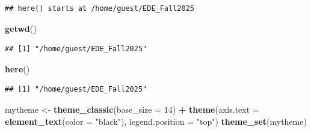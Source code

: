 \documentclass[
]{article}
\newenvironment{Shaded}{\begin{snugshade}}{\end{snugshade}}
\newcommand{\AttributeTok}[1]{\textcolor[rgb]{0.13,0.29,0.53}{#1}}
\newcommand{\DecValTok}[1]{\textcolor[rgb]{0.00,0.00,0.81}{#1}}
\newcommand{\FunctionTok}[1]{\textcolor[rgb]{0.13,0.29,0.53}{\textbf{#1}}}
\newcommand{\NormalTok}[1]{#1}
\newcommand{\OtherTok}[1]{\textcolor[rgb]{0.56,0.35,0.01}{#1}}
\newcommand{\SpecialCharTok}[1]{\textcolor[rgb]{0.81,0.36,0.00}{\textbf{#1}}}
\newcommand{\StringTok}[1]{\textcolor[rgb]{0.31,0.60,0.02}{#1}}
\begin{document}
\begin{verbatim}
## here() starts at /home/guest/EDE_Fall2025
\end{verbatim}

\begin{Shaded}
\begin{Highlighting}[]
\FunctionTok{getwd}\NormalTok{()}
\end{Highlighting}
\end{Shaded}

\begin{verbatim}
## [1] "/home/guest/EDE_Fall2025"
\end{verbatim}

\begin{Shaded}
\begin{Highlighting}[]
\FunctionTok{here}\NormalTok{()}
\end{Highlighting}
\end{Shaded}

\begin{verbatim}
## [1] "/home/guest/EDE_Fall2025"
\end{verbatim}

\begin{Shaded}
\begin{Highlighting}[]
\NormalTok{mytheme }\OtherTok{\textless{}{-}} \FunctionTok{theme\_classic}\NormalTok{(}\AttributeTok{base\_size =} \DecValTok{14}\NormalTok{) }\SpecialCharTok{+}
  \FunctionTok{theme}\NormalTok{(}\AttributeTok{axis.text =} \FunctionTok{element\_text}\NormalTok{(}\AttributeTok{color =} \StringTok{"black"}\NormalTok{), }
        \AttributeTok{legend.position =} \StringTok{"top"}\NormalTok{)}
\FunctionTok{theme\_set}\NormalTok{(mytheme)}
\end{Highlighting}
\end{Shaded}
\end{document}
